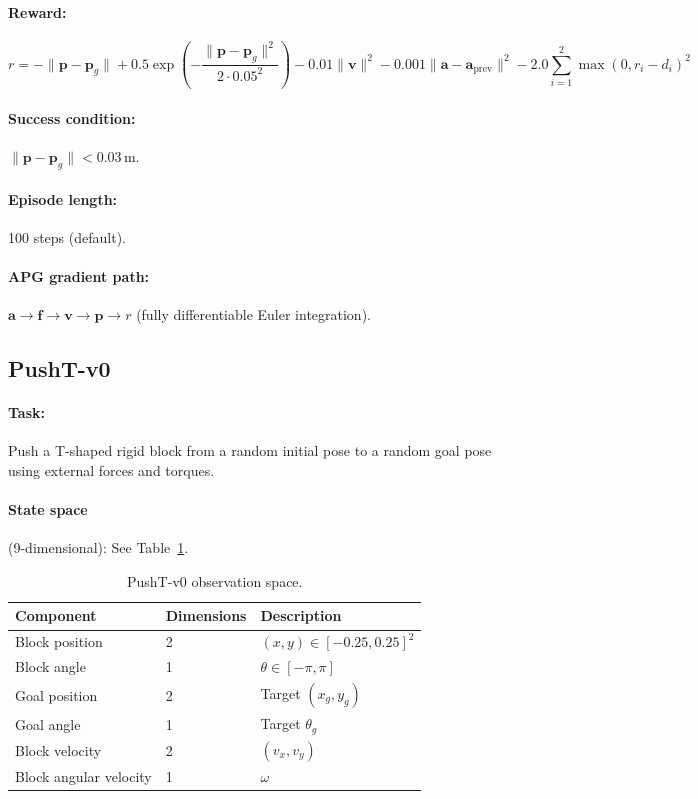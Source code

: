 \documentclass[11pt,a4paper]{article}
\newcommand{\bvf}{\mathbf{v}}
\newcommand{\bpf}{\mathbf{p}}
\newcommand{\bff}{\mathbf{f}}
\newcommand{\ba}{\mathbf{a}}
\begin{document}
\paragraph{Reward:}
\begin{equation}
  r = -\|\bpf - \bpf_g\| + 0.5\exp\!\left(-\frac{\|\bpf - \bpf_g\|^2}{2 \cdot 0.05^2}\right) - 0.01\|\bvf\|^2 - 0.001\|\ba - \ba_{\text{prev}}\|^2 - 2.0 \sum_{i=1}^{2} \max(0, r_i - d_i)^2
  \label{eq:pm_reward}
\end{equation}

\paragraph{Success condition:} $\|\bpf - \bpf_g\| < 0.03$\,m.

\paragraph{Episode length:} 100 steps (default).

\paragraph{APG gradient path:} $\ba \rightarrow \bff \rightarrow \bvf \rightarrow \bpf \rightarrow r$ (fully differentiable Euler integration).

\subsection{PushT-v0}
\label{sec:env_pusht}

\paragraph{Task:} Push a T-shaped rigid block from a random initial pose to a random goal pose using external forces and torques.

\paragraph{State space} (9-dimensional): See Table~\ref{tab:pt_obs}.

\begin{table}[htbp]
  \centering
  \caption{PushT-v0 observation space.}
  \label{tab:pt_obs}
  \begin{tabular}{@{}lll@{}}
    \toprule
    \textbf{Component} & \textbf{Dimensions} & \textbf{Description} \\
    \midrule
    Block position        & 2 & $(x, y) \in [-0.25, 0.25]^2$ \\
    Block angle           & 1 & $\theta \in [-\pi, \pi]$ \\
    Goal position         & 2 & Target $(x_g, y_g)$ \\
    Goal angle            & 1 & Target $\theta_g$ \\
    Block velocity        & 2 & $(v_x, v_y)$ \\
    Block angular velocity & 1 & $\omega$ \\
    \bottomrule
  \end{tabular}
\end{table}
\end{document}
